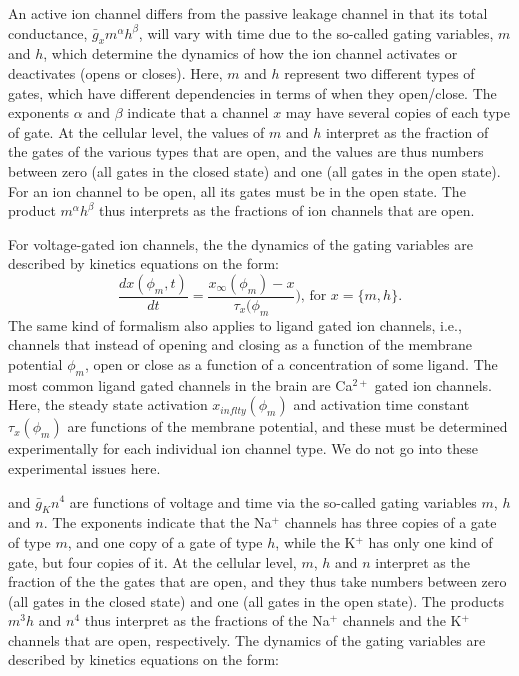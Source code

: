An active ion channel differs from the passive leakage channel in that its total conductance, $\bar{g}_{x} m^{\alpha} h^{\beta}$, will vary with time due to the so-called gating variables, $m$ and $h$, which determine the dynamics of how the ion channel activates or deactivates (opens or closes). Here, $m$ and $h$ represent two different types of gates, which have different dependencies in terms of when they open/close. The exponents $\alpha$ and $\beta$ indicate that a channel $x$ may have several copies of each type of gate.  At the cellular level, the values of $m$ and $h$ interpret as the fraction of the gates of the various types that are open, and the values are thus numbers between zero (all gates in the closed state) and one (all gates in the open state). For an ion channel to be open, all its gates must be in the open state. The product $m^{\alpha} h^{\beta}$ thus interprets as the fractions of ion channels that are open.

For voltage-gated ion channels, the the dynamics of the gating variables are described by kinetics equations on the form:
\begin{equation}
\frac{dx(\phi_m,t)}{dt} = \frac{x_{\infty}(\phi_m) - x}{\tau_x(\phi_m}),  \, \text{for } x = \{m,h\}.
\label{eq:HHgate}
\end{equation}
The same kind of formalism also applies to ligand gated ion channels, i.e., channels that instead of opening and closing as a function of the membrane potential $\phi_m$, open or close as a function of a concentration of some ligand. The most common ligand gated channels in the brain are Ca$^{2+}$ gated ion channels. Here, the steady state activation $x_{inflty}(\phi_m)$ and activation time constant $\tau_x(\phi_m)$ are functions of the membrane potential, and these must be determined experimentally for each individual ion channel type. We do not go into these experimental issues here. 



and  $\bar{g}_{K} n^4$ are functions of voltage and time via the so-called gating variables $m$, $h$ and $n$. The exponents indicate that the Na$^+$ channels has three copies of a gate of type $m$, and one copy of a gate of type $h$, while the K$^+$ has only one kind of gate, but four copies of it. At the cellular level, $m$, $h$ and $n$ interpret as the fraction of the the gates that are open, and they thus take numbers between zero (all gates in the closed state) and one (all gates in the open state). The products $m^3 h$ and $n^4$ thus interpret as the fractions of the Na$^+$ channels and the K$^+$ channels that are open, respectively. The dynamics of the gating variables are described by kinetics equations on the form:


